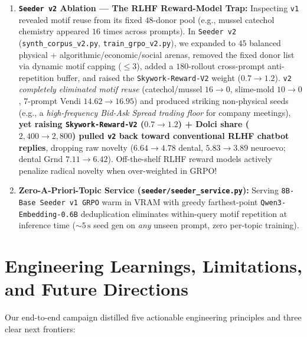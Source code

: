 \documentclass[10.5pt,letterpaper]{article}
\begin{document}
\begin{enumerate}
  \item \textbf{\texttt{Seeder v2} Ablation — The RLHF Reward-Model Trap:} Inspecting \texttt{v1} revealed motif reuse from its fixed $48$-donor pool (e.g., mussel catechol chemistry appeared $16$ times across prompts). In \texttt{Seeder v2} (\texttt{synth\_corpus\_v2.py}, \texttt{train\_grpo\_v2.py}), we expanded to $45$ balanced physical + algorithmic/economic/social arenas, removed the fixed donor list via dynamic motif capping ($\le 3$), added a $180$-rollout cross-prompt anti-repetition buffer, and raised the \texttt{Skywork-Reward-V2} weight ($0.7 \to 1.2$). \texttt{v2} \emph{completely eliminated motif reuse} (catechol/mussel $16 \to 0$, slime-mold $10 \to 0$, 7-prompt Vendi $14.62 \to 16.95$) and produced striking non-physical seeds (e.g., a \emph{high-frequency Bid-Ask Spread trading floor} for company meetings), \textbf{yet raising \texttt{Skywork-Reward-V2} ($0.7 \to 1.2$) + Dolci share ($2{,}400 \to 2{,}800$) pulled \texttt{v2} back toward conventional RLHF chatbot replies}, dropping raw novelty ($6.64 \to 4.78$ dental, $5.83 \to 3.89$ neuroevo; dental Grnd $7.11 \to 6.42$). Off-the-shelf RLHF reward models actively penalize radical novelty when over-weighted in GRPO!
  \item \textbf{Zero-A-Priori-Topic Service (\texttt{seeder/seeder\_service.py}):} Serving \texttt{8B-Base Seeder v1 GRPO} warm in VRAM with greedy farthest-point \texttt{Qwen3-Embedding-0.6B} deduplication eliminates within-query motif repetition at inference time ($\sim\!5\,\text{s}$ seed gen on \emph{any} unseen prompt, zero per-topic training).
\end{enumerate}

\section{Engineering Learnings, Limitations, and Future Directions}

Our end-to-end campaign distilled five actionable engineering principles and three clear next frontiers:
\end{document}
